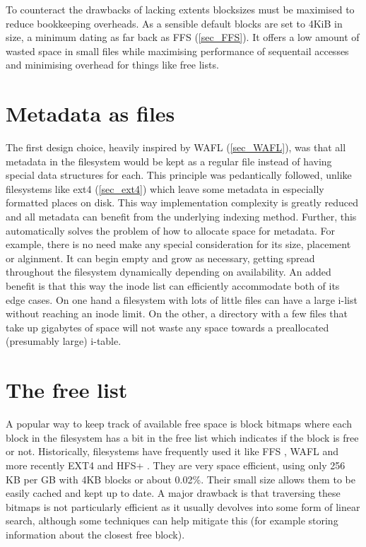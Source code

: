         To counteract the drawbacks of lacking extents blocksizes must be
        maximised to reduce bookkeeping overheads. As a sensible default blocks
        are set to 4KiB in size, a minimum dating as far back as FFS
        (\ref{sec_FFS}). It offers a low amount of wasted space in small files
        while maximising performance of sequentail accesses and minimising
        overhead for things like free lists.

    \section{Metadata as files}
        \label{sec_files}

        The first design choice, heavily inspired by WAFL (\ref{sec_WAFL}), was
        that all metadata in the filesystem would be kept as a regular file
        instead of having special data structures for each. This principle was
        pedantically followed, unlike filesystems like ext4 (\ref{sec_ext4})
        which leave some metadata in especially formatted places on disk. This
        way implementation complexity is greatly reduced and all metadata can
        benefit from the underlying indexing method. Further, this
        automatically solves the problem of how to allocate space for metadata.
        For example, there is no need make any special consideration for its
        size, placement or alginment. It can begin empty and grow as necessary,
        getting spread throughout the filesystem dynamically depending on
        availability. An added benefit is that this way the inode list can
        efficiently accommodate both of its edge cases. On one hand a
        filesystem with lots of little files can have a large i-list without
        reaching an inode limit. On the other, a directory with a few files
        that take up gigabytes of space will not waste any space towards a
        preallocated (presumably large) i-table.

    \section{The free list}
        \label{sec_free_list}

        A popular way to keep track of available free space is block bitmaps
        where each block in the filesystem has a bit in the free list which
        indicates if the block is free or not. Historically, filesystems have
        frequently used it like FFS \cite{FFS}, WAFL \cite{WAFL} and more
        recently EXT4 \cite{ext4_space_maps} and HFS+ \cite{HFSplus}. They are
        very space efficient, using only 256 KB per GB with 4KB blocks or about
        0.02\%. Their small size allows them to be easily cached and kept up to
        date. A major drawback is that traversing these bitmaps is not
        particularly efficient as it usually devolves into some form of linear
        search, although some techniques can help mitigate this (for example
        storing information about the closest free block).

